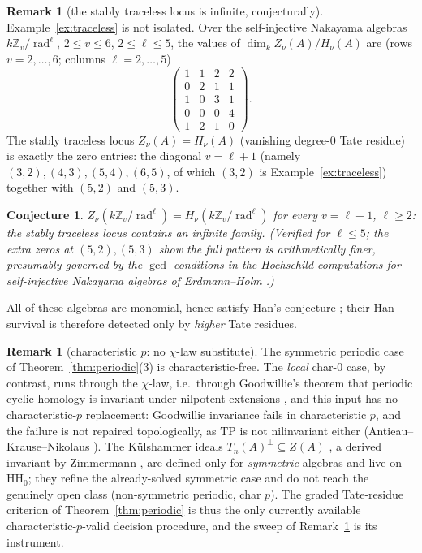 \documentclass[11pt]{amsart}
\newtheorem{conjecture}[theorem]{Conjecture}
\theoremstyle{definition}
\newtheorem{remark}[theorem]{Remark}
\newcommand{\HH}{\mathrm{HH}}
\newcommand{\rad}{\operatorname{rad}}
\newcommand{\kk}{k}
\begin{document}
\begin{remark}[the stably traceless locus is infinite, conjecturally]\label{rem:sweep}
Example~\ref{ex:traceless} is not isolated. Over the self-injective
Nakayama algebras $\kk\mathbb Z_v/\rad^\ell$, $2\le v\le6$, $2\le\ell\le5$,
the values of $\dim_\kk Z_\nu(A)/H_\nu(A)$ are
(rows $v=2,\dots,6$; columns $\ell=2,\dots,5$)
\[
\begin{pmatrix}
1&1&2&2\\ 0&2&1&1\\ 1&0&3&1\\ 0&0&0&4\\ 1&2&1&0
\end{pmatrix}.
\]
The stably traceless locus $Z_\nu(A)=H_\nu(A)$ (vanishing degree-$0$ Tate
residue) is exactly the zero entries: the diagonal $v=\ell+1$ (namely
$(3,2),(4,3),(5,4),(6,5)$, of which $(3,2)$ is Example~\ref{ex:traceless})
together with $(5,2)$ and $(5,3)$.

\begin{conjecture}\label{conj:traceless}
$Z_\nu(\kk\mathbb Z_v/\rad^\ell)=H_\nu(\kk\mathbb Z_v/\rad^\ell)$ for every
$v=\ell+1$, $\ell\ge2$: the stably traceless locus contains an infinite family.
(Verified for $\ell\le5$; the extra zeros at $(5,2),(5,3)$ show the full
pattern is arithmetically finer, presumably governed by the $\gcd$-conditions
in the Hochschild computations for self-injective Nakayama algebras of
Erdmann--Holm \cite{ErdmannHolm}.)
\end{conjecture}

All of these algebras are monomial, hence satisfy Han's conjecture
\cite{Han06}; their Han-survival is therefore detected only by \emph{higher}
Tate residues. 
\end{remark}

\begin{remark}[characteristic $p$: no $\chi$-law substitute]\label{rem:charp}
The symmetric periodic case of Theorem~\ref{thm:periodic}(3) is
characteristic-free. The \emph{local} char-$0$ case, by contrast, runs through
the $\chi$-law, i.e.\ through Goodwillie's theorem that periodic cyclic
homology is invariant under nilpotent extensions \cite{Goodwillie}, and this
input has no characteristic-$p$ replacement: Goodwillie invariance fails in
characteristic $p$, and the failure is not repaired topologically, as $\mathrm{TP}$
is not nilinvariant either (Antieau--Krause--Nikolaus \cite{AKN}). The
K\"ulshammer ideals $T_n(A)^\perp\subseteq Z(A)$ \cite{Kulshammer}, a derived
invariant by Zimmermann \cite{Zimmermann}, are defined only for
\emph{symmetric} algebras and live on $\HH_0$; they refine the already-solved
symmetric case and do not reach the genuinely open class (non-symmetric
periodic, char $p$). The graded Tate-residue criterion of
Theorem~\ref{thm:periodic} is thus the only currently available
characteristic-$p$-valid decision procedure, and the sweep of
Remark~\ref{rem:sweep} is its instrument.
\end{remark}
\end{document}
